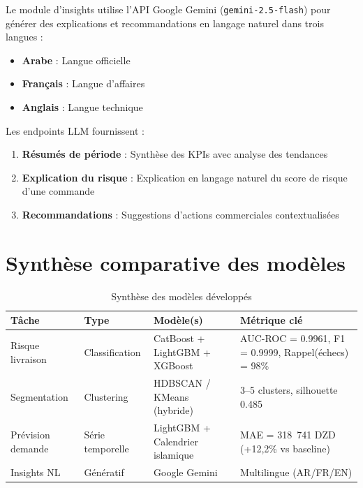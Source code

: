 \documentclass[12pt,a4paper]{report}
\begin{document}
Le module d'insights utilise l'API Google Gemini (\texttt{gemini-2.5-flash}) pour g\'{e}n\'{e}rer des explications et recommandations en langage naturel dans trois langues :

\begin{itemize}
  \item \textbf{Arabe} : Langue officielle
  \item \textbf{Fran\c{c}ais} : Langue d'affaires
  \item \textbf{Anglais} : Langue technique
\end{itemize}

Les endpoints LLM fournissent :
\begin{enumerate}
  \item \textbf{R\'{e}sum\'{e}s de p\'{e}riode} : Synth\`{e}se des KPIs avec analyse des tendances
  \item \textbf{Explication du risque} : Explication en langage naturel du score de risque d'une commande
  \item \textbf{Recommandations} : Suggestions d'actions commerciales contextualis\'{e}es
\end{enumerate}

\section{Synth\`{e}se comparative des mod\`{e}les}

\begin{table}[H]
\centering
\caption{Synth\`{e}se des mod\`{e}les d\'{e}velopp\'{e}s}
\label{tab:synthesis}
\begin{tabularx}{\textwidth}{l l l X}
\toprule
\textbf{T\^{a}che} & \textbf{Type} & \textbf{Mod\`{e}le(s)} & \textbf{M\'{e}trique cl\'{e}} \\
\midrule
Risque livraison & Classification & CatBoost + LightGBM + XGBoost & AUC-ROC = 0.9961, F1 = 0.9999, Rappel(\'echecs) = 98\% \\
Segmentation & Clustering & HDBSCAN / KMeans (hybride) & 3--5 clusters, silhouette 0.485 \\
Pr\'{e}vision demande & S\'{e}rie temporelle & LightGBM + Calendrier islamique & MAE = 318~741 DZD (+12,2\% vs baseline) \\
Insights NL & G\'{e}n\'{e}ratif & Google Gemini & Multilingue (AR/FR/EN) \\
\bottomrule
\end{tabularx}
\end{table}


\end{document}
